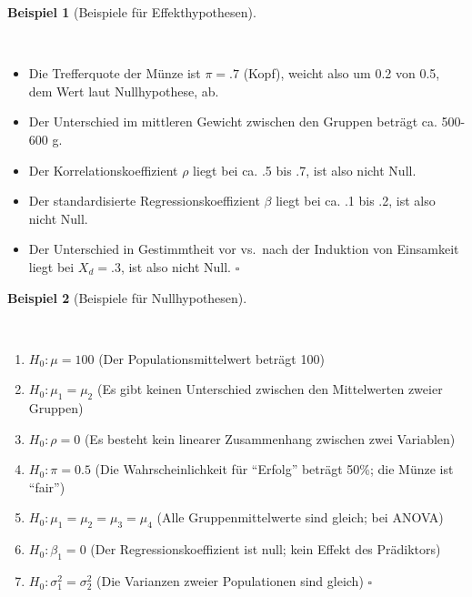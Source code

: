 \documentclass[
  ngerman,
  letterpaper,
  twoside,
  open=any]{scrbook}
\providecommand{\tightlist}{%
  \setlength{\itemsep}{0pt}\setlength{\parskip}{0pt}}\usepackage{longtable,booktabs,array}
\theoremstyle{definition}
\newtheorem{example}{Beispiel}[chapter]
\theoremstyle{plain}
\theoremstyle{definition}
\theoremstyle{definition}
\theoremstyle{remark}
\begin{document}
\begin{example}[Beispiele für
Effekthypothesen]\protect\hypertarget{exm-effekt}{}\label{exm-effekt}

~

\begin{itemize}
\tightlist
\item
  Die Trefferquote der Münze ist \(\pi = .7\) (Kopf), weicht also um 0.2
  von 0.5, dem Wert laut Nullhypothese, ab.
\item
  Der Unterschied im mittleren Gewicht zwischen den Gruppen beträgt ca.
  500-600 g.
\item
  Der Korrelationskoeffizient \(\rho\) liegt bei ca. .5 bis .7, ist also
  nicht Null.
\item
  Der standardisierte Regressionskoeffizient \(\beta\) liegt bei ca. .1
  bis .2, ist also nicht Null.
\item
  Der Unterschied in Gestimmtheit vor vs.~nach der Induktion von
  Einsamkeit liegt bei \(X_d = .3\), ist also nicht Null. \(\square\)
\end{itemize}

\end{example}

\begin{example}[Beispiele für
Nullhypothesen]\protect\hypertarget{exm-nullhyp}{}\label{exm-nullhyp}

~

\begin{enumerate}
\def\labelenumi{\Alph{enumi})}
\tightlist
\item
  \(H_0: \mu = 100\) (Der Populationsmittelwert beträgt 100)
\item
  \(H_0: \mu_1 = \mu_2\) (Es gibt keinen Unterschied zwischen den
  Mittelwerten zweier Gruppen)
\item
  \(H_0: \rho = 0\) (Es besteht kein linearer Zusammenhang zwischen zwei
  Variablen)
\item
  \(H_0: \pi = 0.5\) (Die Wahrscheinlichkeit für \enquote{Erfolg}
  beträgt 50\%; die Münze ist \enquote{fair})
\item
  \(H_0: \mu_1 = \mu_2 = \mu_3 = \mu_4\) (Alle Gruppenmittelwerte sind
  gleich; bei ANOVA)
\item
  \(H_0: \beta_1 = 0\) (Der Regressionskoeffizient ist null; kein Effekt
  des Prädiktors)
\item
  \(H_0: \sigma_1^2 = \sigma_2^2\) (Die Varianzen zweier Populationen
  sind gleich) \(\square\)
\end{enumerate}

\end{example}
\end{document}
